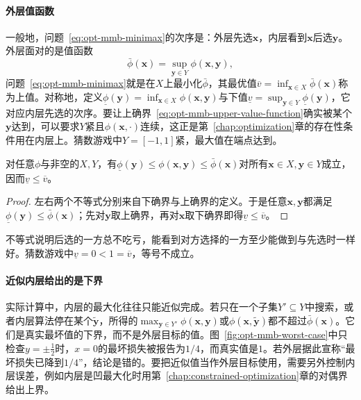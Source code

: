 \paragraph{外层值函数}
一般地，问题~\eqref{eq:opt-mmb-minimax}的次序是：外层先选$\bm x$，内层看到$\bm x$后选$\bm y$。外层面对的是值函数
\begin{equation}
\label{eq:opt-mmb-upper-value-function}
\bar\phi(\bm x)=\sup_{\bm y\in Y}\phi(\bm x,\bm y),
\end{equation}
问题~\eqref{eq:opt-mmb-minimax}就是在$X$上最小化$\bar\phi$，其最优值$\overline v=\inf_{\bm x\in X}\bar\phi(\bm x)$称为上值。对称地，定义$\underline\phi(\bm y)=\inf_{\bm x\in X}\phi(\bm x,\bm y)$与下值$\underline v=\sup_{\bm y\in Y}\underline\phi(\bm y)$，它对应内层先选的次序。要让上确界~\eqref{eq:opt-mmb-upper-value-function}确实被某个$\bm y$达到，可以要求$Y$紧且$\phi(\bm x,\cdot)$连续，这正是第~\ref{chap:optimization}章的存在性条件用在内层上。猜数游戏中$Y=[-1,1]$紧，最大值在端点达到。

\begin{lemma}[弱极小极大不等式]
\label{lem:opt-mmb-weak-minimax}
对任意$\phi$与非空的$X,Y$，有$\underline\phi(\bm y)\leq\phi(\bm x,\bm y)\leq\bar\phi(\bm x)$对所有$\bm x\in X,\bm y\in Y$成立，因而$\underline v\leq\overline v$。
\end{lemma}

\begin{proof}
左右两个不等式分别来自下确界与上确界的定义。于是任意$\bm x,\bm y$都满足$\underline\phi(\bm y)\leq\bar\phi(\bm x)$；先对$\bm y$取上确界，再对$\bm x$取下确界即得$\underline v\leq\overline v$。
\end{proof}

不等式说明后选的一方总不吃亏，能看到对方选择的一方至少能做到与先选时一样好。猜数游戏中$\underline v=0<1=\overline v$，等号不成立。

\paragraph{近似内层给出的是下界}
实际计算中，内层的最大化往往只能近似完成。若只在一个子集$Y'\subseteq Y$中搜索，或者内层算法停在某个$\tilde{\bm y}$，所得的$\max_{\bm y\in Y'}\phi(\bm x,\bm y)$或$\phi(\bm x,\tilde{\bm y})$都不超过$\bar\phi(\bm x)$。它们是真实最坏值的下界，而不是外层目标的值。图~\ref{fig:opt-mmb-worst-case}中只检查$y=\pm\frac12$时，$x=0$的最坏损失被报告为$1/4$，而真实值是$1$。若外层据此宣称“最坏损失已降到$1/4$”，结论是错的。要把近似值当作外层目标使用，需要另外控制内层误差，例如内层是凹最大化时用第~\ref{chap:constrained-optimization}章的对偶界给出上界。

